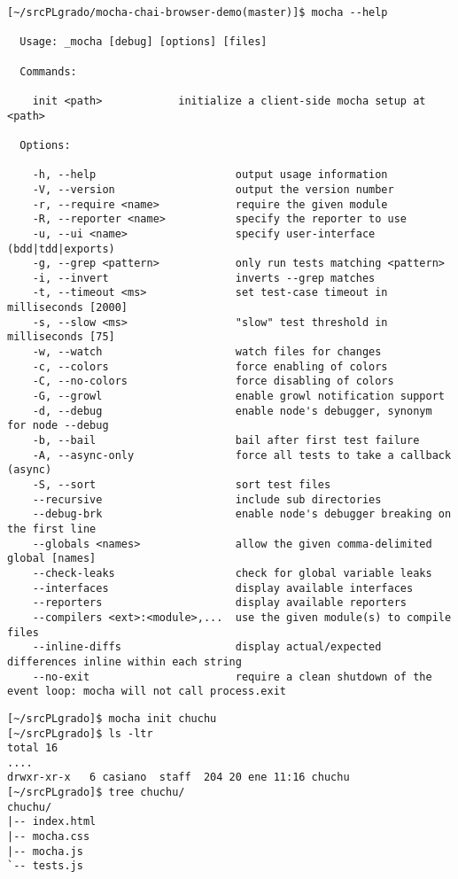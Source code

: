 \begin{verbatim}
[~/srcPLgrado/mocha-chai-browser-demo(master)]$ mocha --help

  Usage: _mocha [debug] [options] [files]

  Commands:

    init <path>            initialize a client-side mocha setup at <path>

  Options:

    -h, --help                      output usage information
    -V, --version                   output the version number
    -r, --require <name>            require the given module
    -R, --reporter <name>           specify the reporter to use
    -u, --ui <name>                 specify user-interface (bdd|tdd|exports)
    -g, --grep <pattern>            only run tests matching <pattern>
    -i, --invert                    inverts --grep matches
    -t, --timeout <ms>              set test-case timeout in milliseconds [2000]
    -s, --slow <ms>                 "slow" test threshold in milliseconds [75]
    -w, --watch                     watch files for changes
    -c, --colors                    force enabling of colors
    -C, --no-colors                 force disabling of colors
    -G, --growl                     enable growl notification support
    -d, --debug                     enable node's debugger, synonym for node --debug
    -b, --bail                      bail after first test failure
    -A, --async-only                force all tests to take a callback (async)
    -S, --sort                      sort test files
    --recursive                     include sub directories
    --debug-brk                     enable node's debugger breaking on the first line
    --globals <names>               allow the given comma-delimited global [names]
    --check-leaks                   check for global variable leaks
    --interfaces                    display available interfaces
    --reporters                     display available reporters
    --compilers <ext>:<module>,...  use the given module(s) to compile files
    --inline-diffs                  display actual/expected differences inline within each string
    --no-exit                       require a clean shutdown of the event loop: mocha will not call process.exit
\end{verbatim}

\begin{verbatim}
[~/srcPLgrado]$ mocha init chuchu
[~/srcPLgrado]$ ls -ltr
total 16
....
drwxr-xr-x   6 casiano  staff  204 20 ene 11:16 chuchu
[~/srcPLgrado]$ tree chuchu/
chuchu/
|-- index.html
|-- mocha.css
|-- mocha.js
`-- tests.js
\end{verbatim}

